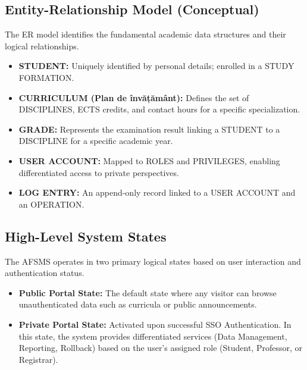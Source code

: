 \documentclass[11pt, a4paper]{article}
\begin{document}
\subsection{Entity-Relationship Model (Conceptual)}
The ER model identifies the fundamental academic data structures and their logical relationships.
\begin{itemize}
    \item \textbf{STUDENT:} Uniquely identified by personal details; enrolled in a STUDY FORMATION.
    \item \textbf{CURRICULUM (Plan de învățământ):} Defines the set of DISCIPLINES, ECTS credits, and contact hours for a specific specialization.
    \item \textbf{GRADE:} Represents the examination result linking a STUDENT to a DISCIPLINE for a specific academic year.
    \item \textbf{USER ACCOUNT:} Mapped to ROLES and PRIVILEGES, enabling differentiated access to private perspectives.
    \item \textbf{LOG ENTRY:} An append-only record linked to a USER ACCOUNT and an OPERATION.
\end{itemize}

\subsection{High-Level System States}
The AFSMS operates in two primary logical states based on user interaction and authentication status.
\begin{itemize}
    \item \textbf{Public Portal State:} The default state where any visitor can browse unauthenticated data such as curricula or public announcements.
    \item \textbf{Private Portal State:} Activated upon successful SSO Authentication. In this state, the system provides differentiated services (Data Management, Reporting, Rollback) based on the user's assigned role (Student, Professor, or Registrar).
\end{itemize}
\end{document}
